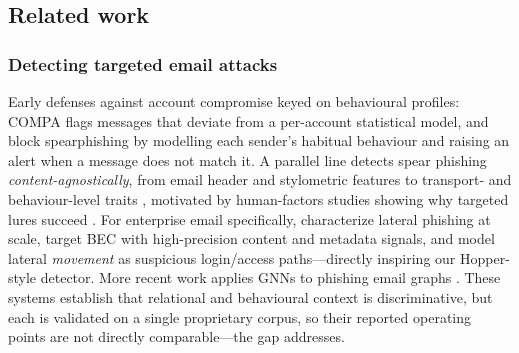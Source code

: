 \subsection{Related work}
\label{sec:related}

\subsubsection{Detecting targeted email attacks}
Early defenses against account compromise keyed on behavioural profiles: COMPA
\cite{egele2013compa} flags messages that deviate from a per-account statistical model, and
\citet{stringhini2015thataint} block spearphishing by modelling each sender's habitual
behaviour and raising an alert when a message does not match it. A parallel line detects
spear phishing \emph{content-agnostically}, from email header and stylometric features
\cite{duman2016emailprofiler} to transport- and behaviour-level traits
\cite{gascon2018reading}, motivated by human-factors studies showing why targeted lures
succeed \cite{halevi2015spearphishing}. For enterprise email specifically,
\citet{ho2019detecting} characterize lateral phishing at scale, \citet{cidon2019high} target
BEC with high-precision content and metadata signals, and \citet{ho2021hopper} model lateral
\emph{movement} as suspicious login/access paths---directly inspiring our Hopper-style
detector. More recent work applies GNNs to phishing email graphs \cite{safran2025phishinggnn}.
These systems establish that relational and behavioural context is discriminative, but each is
validated on a single proprietary corpus, so their reported operating points are not directly
comparable---the gap \tool addresses.

